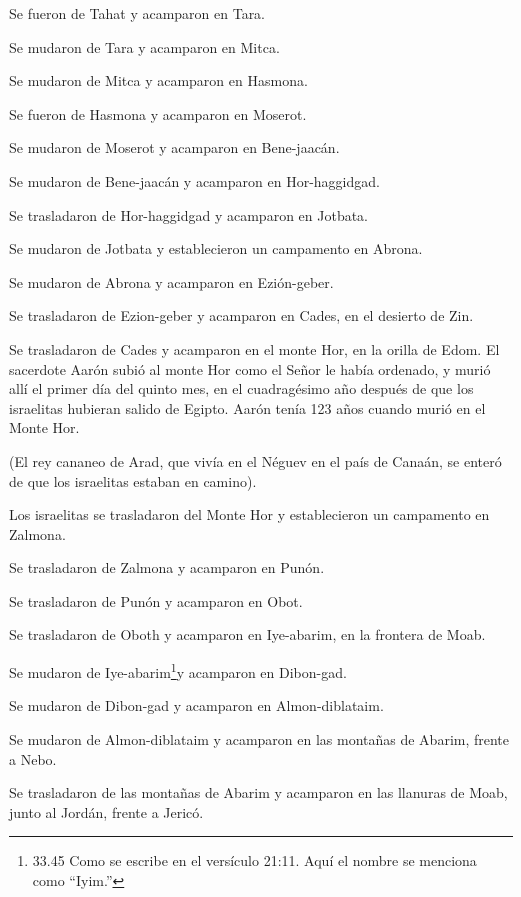  Se fueron de Tahat y acamparon en Tara.

 Se mudaron de Tara y acamparon en Mitca.

 Se mudaron de Mitca y acamparon en Hasmona.

 Se fueron de Hasmona y acamparon en Moserot.

 Se mudaron de Moserot y acamparon en Bene-jaacán.

 Se mudaron de Bene-jaacán y acamparon en Hor-haggidgad.

 Se trasladaron de Hor-haggidgad y acamparon en Jotbata.

 Se mudaron de Jotbata y establecieron un campamento en
Abrona.

 Se mudaron de Abrona y acamparon en Ezión-geber.

 Se trasladaron de Ezion-geber y acamparon en Cades, en el
desierto de Zin.

 Se trasladaron de Cades y acamparon en el monte Hor, en la
orilla de Edom.  El sacerdote Aarón subió al monte Hor como
el Señor le había ordenado, y murió allí el primer día del quinto mes,
en el cuadragésimo año después de que los israelitas hubieran salido de
Egipto.  Aarón tenía 123 años cuando murió en el Monte Hor.

 (El rey cananeo de Arad, que vivía en el Néguev en el país
de Canaán, se enteró de que los israelitas estaban en camino).

 Los israelitas se trasladaron del Monte Hor y
establecieron un campamento en Zalmona.

 Se trasladaron de Zalmona y acamparon en Punón.

 Se trasladaron de Punón y acamparon en Obot.

 Se trasladaron de Oboth y acamparon en Iye-abarim, en la
frontera de Moab.

 Se mudaron de Iye-abarim\footnote{33.45 Como se escribe en
  el versículo 21:11. Aquí el nombre se menciona como ``Iyim.''}y
acamparon en Dibon-gad.

 Se mudaron de Dibon-gad y acamparon en Almon-diblataim.

 Se mudaron de Almon-diblataim y acamparon en las montañas
de Abarim, frente a Nebo.

 Se trasladaron de las montañas de Abarim y acamparon en
las llanuras de Moab, junto al Jordán, frente a Jericó.

